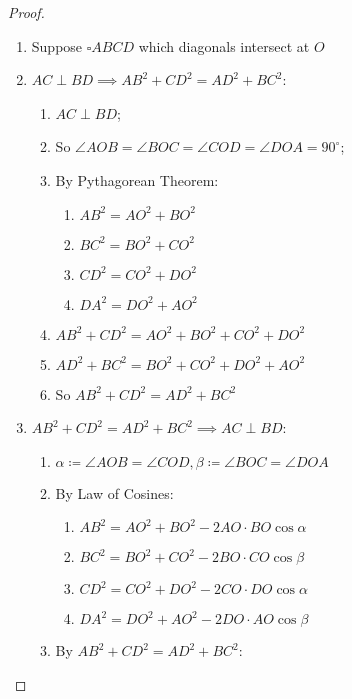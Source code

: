 \documentclass{article}
\begin{document}
\begin{proof}

~
    \begin{enumerate}
    \item Suppose $\square ABCD$ which diagonals intersect at $O$
    \item $AC\perp BD\implies AB^2+CD^2=AD^2+BC^2$:
    \begin{enumerate}
        \item $AC\perp BD$;
        \item So $\angle AOB=\angle BOC=\angle COD=\angle DOA=90^\circ$;
        \item By Pythagorean Theorem: 
        \begin{enumerate}
            \item $AB^2=AO^2+BO^2$
            \item $BC^2=BO^2+CO^2$
            \item $CD^2=CO^2+DO^2$
            \item $DA^2=DO^2+AO^2$
        \end{enumerate}
        \item $AB^2+CD^2=AO^2+BO^2+CO^2+DO^2$
        \item $AD^2+BC^2=BO^2+CO^2+DO^2+AO^2$
        \item So $AB^2+CD^2=AD^2+BC^2$
    \end{enumerate}
    \item $AB^2+CD^2=AD^2+BC^2\implies AC\perp BD$:
    \begin{enumerate}
        \item $\alpha\coloneqq\angle AOB=\angle COD, \beta\coloneqq \angle BOC=\angle DOA$
        \item By Law of Cosines:
        \begin{enumerate}
            \item $AB^2= AO^2+BO^2-2AO\cdot BO\cos \alpha$
            \item $BC^2= BO^2+CO^2-2BO\cdot CO\cos \beta$
            \item $CD^2= CO^2+DO^2-2CO\cdot DO\cos \alpha$
            \item $DA^2= DO^2+AO^2-2DO\cdot AO\cos \beta$
        \end{enumerate}
        \item By $AB^2+CD^2=AD^2+BC^2$:
        

\end{enumerate}
\end{enumerate}
\end{proof}
\end{document}
